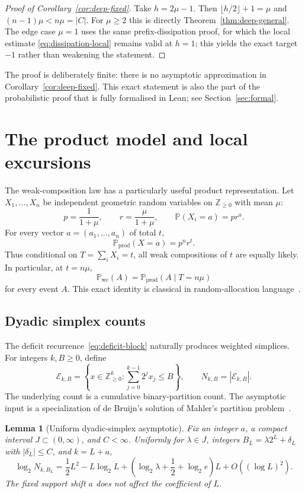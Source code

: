 \documentclass[11pt]{article}
\newtheorem{lemma}[theorem]{Lemma}
\newcommand{\Prob}{\mathbb P}
\newcommand{\Z}{\mathbb Z}
\newcommand{\wc}{\mathrm{wc}}
\newcommand{\prodprob}{\mathrm{prod}}
\begin{document}
\begin{proof}[Proof of Corollary~\ref{cor:deep-fixed}]
Take $h=2\mu-1$.  Then
$\lfloor h/2\rfloor+1=\mu$ and
$(n-1)\mu<n\mu=|C|$.  For $\mu\ge2$ this is directly
Theorem~\ref{thm:deep-general}.  The edge case $\mu=1$ uses the same
prefix-dissipation proof, for which the local estimate
\eqref{eq:dissipation-local} remains valid at $h=1$; this yields the exact
target $-1$ rather than weakening the statement.
\end{proof}

The proof is deliberately finite: there is no asymptotic approximation in
Corollary~\ref{cor:deep-fixed}.  This exact statement is also the part of the
probabilistic proof that is fully formalised in Lean; see
Section~\ref{sec:formal}.

\section{The product model and local excursions}\label{sec:local}

The weak-composition law has a particularly useful product representation.
Let $X_1,\dots,X_n$ be independent geometric random variables on
$\Z_{\ge0}$ with mean $\mu$:
\[
 p=\frac1{1+\mu},\qquad r=\frac{\mu}{1+\mu},\qquad
 \Prob(X_i=a)=pr^a.
 \tag{5.1}\label{eq:geometric}
\]
For every vector $a=(a_1,\dots,a_n)$ of total $t$,
\[
 \Prob_{\prodprob}(X=a)=p^nr^t.
\]
Thus conditional on $T=\sum_iX_i=t$, all weak compositions of $t$ are equally
likely.  In particular, at $t=n\mu$,
\[
 \Prob_{\wc}(A)=\Prob_{\prodprob}(A\mid T=n\mu)
 \tag{5.2}\label{eq:conditioning-identity}
\]
for every event $A$.  This exact identity is classical in random-allocation
language~\cite{Janson2012}.

\subsection{Dyadic simplex counts}

The deficit recurrence~\eqref{eq:deficit-block} naturally produces weighted
simplices.  For integers $k,B\ge0$, define
\[
 \mathcal E_{k,B}
 =\left\{x\in\Z_{\ge0}^k:
          \sum_{j=0}^{k-1}2^jx_j\le B\right\},
 \qquad N_{k,B}=|\mathcal E_{k,B}|.
 \tag{5.3}\label{eq:dyadic-simplex}
\]
The underlying count is a cumulative binary-partition count.  The asymptotic
input is a specialization of de Bruijn's solution of Mahler's partition
problem~\cite{Mahler1940,deBruijn1948}.

\begin{lemma}[Uniform dyadic-simplex asymptotic]\label{lem:dyadic-asymptotic}
Fix an integer $a$, a compact interval $J\subset(0,\infty)$, and $C<\infty$.
Uniformly for $\lambda\in J$, integers $B_L=\lambda2^L+\delta_L$ with
$|\delta_L|\le C$, and $k=L+a$,
\[
 \log_2N_{k,B_L}
 =\frac12L^2-L\log_2L
  +\left(\log_2\lambda+\frac12+\log_2e\right)L
  +O((\log L)^2).
 \tag{5.4}\label{eq:dyadic-asymptotic}
\]
The fixed support shift $a$ does not affect the coefficient of $L$.
\end{lemma}
\end{document}

